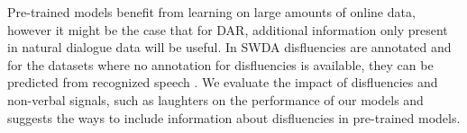 \documentclass[11pt,a4paper,headings=standardclasses]{article}
\begin{document}
  Pre-trained models benefit from learning on large amounts of online data, however it might be the case that for DAR, additional information only present in natural dialogue data will be useful. In SWDA disfluencies are annotated and for the datasets where no annotation for disfluencies is available, they can be predicted from recognized speech \citep{hough2017joint,shalyminov2018multi}. We evaluate the impact of disfluencies and non-verbal signals, such as laughters on the performance of our models and suggests the ways to include information about disfluencies in pre-trained models. 


{}

\end{document}
